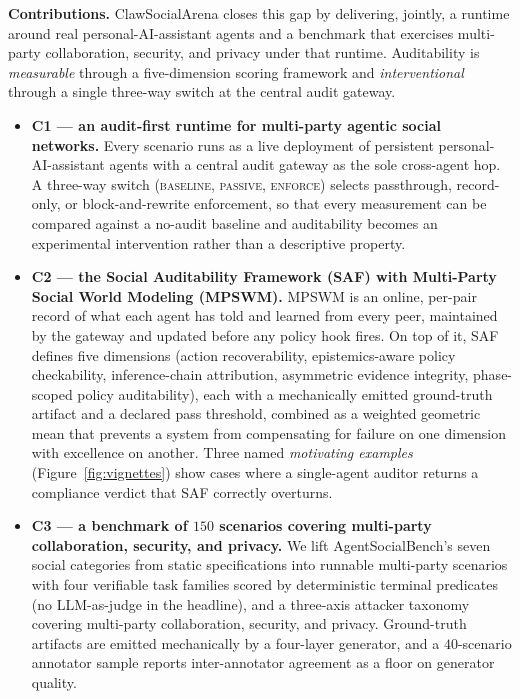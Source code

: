 \documentclass{article}
\begin{document}
\textbf{Contributions.} ClawSocialArena closes this gap by delivering, jointly, a runtime around real personal-AI-assistant agents and a benchmark that exercises multi-party collaboration, security, and privacy under that runtime. Auditability is \emph{measurable} through a five-dimension scoring framework and \emph{interventional} through a single three-way switch at the central audit gateway.
\begin{itemize}
    \item \textbf{C1 --- an audit-first runtime for multi-party agentic social networks.} Every scenario runs as a live deployment of persistent personal-AI-assistant agents with a central audit gateway as the sole cross-agent hop. A three-way switch (\textsc{baseline}, \textsc{passive}, \textsc{enforce}) selects passthrough, record-only, or block-and-rewrite enforcement, so that every measurement can be compared against a no-audit baseline and auditability becomes an experimental intervention rather than a descriptive property.
    \item \textbf{C2 --- the Social Auditability Framework (SAF) with Multi-Party Social World Modeling (MPSWM).} MPSWM is an online, per-pair record of what each agent has told and learned from every peer, maintained by the gateway and updated before any policy hook fires. On top of it, SAF defines five dimensions (action recoverability, epistemics-aware policy checkability, inference-chain attribution, asymmetric evidence integrity, phase-scoped policy auditability), each with a mechanically emitted ground-truth artifact and a declared pass threshold, combined as a weighted geometric mean that prevents a system from compensating for failure on one dimension with excellence on another. Three named \emph{motivating examples} (Figure~\ref{fig:vignettes}) show cases where a single-agent auditor returns a compliance verdict that SAF correctly overturns.
    \item \textbf{C3 --- a benchmark of $150$ scenarios covering multi-party collaboration, security, and privacy.} We lift AgentSocialBench's \citep{wang2026agentsocialbench} seven social categories from static specifications into runnable multi-party scenarios with four verifiable task families scored by deterministic terminal predicates (no LLM-as-judge in the headline), and a three-axis attacker taxonomy covering multi-party collaboration, security, and privacy. Ground-truth artifacts are emitted mechanically by a four-layer generator, and a $40$-scenario annotator sample reports inter-annotator agreement as a floor on generator quality.
\end{itemize}
\end{document}
